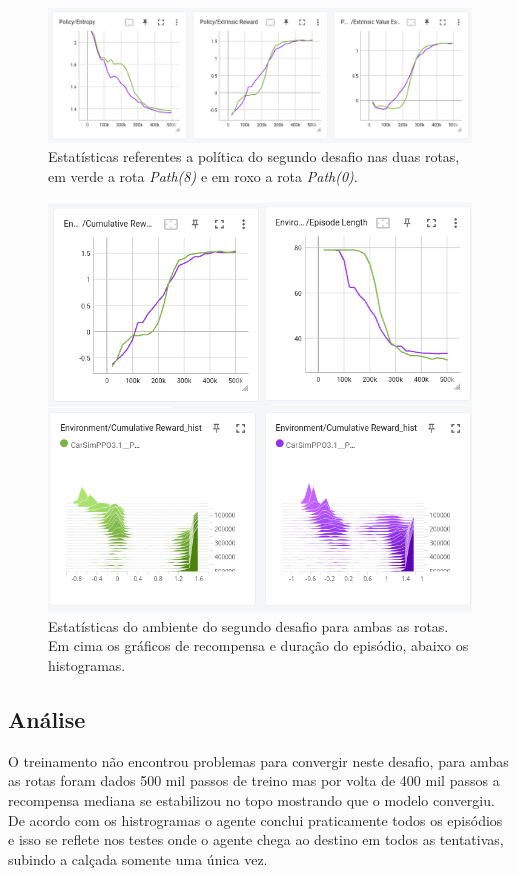 \begin{figure}[h]
    \centering
    \includegraphics[scale=0.35]{figs/treinos/desafio-mediano/politica.png}
    \caption{Estatísticas referentes a política do segundo desafio nas duas rotas, em verde a rota \textit{Path(8)} e em roxo a rota \textit{Path(0)}.}
\end{figure}

\begin{figure}[h]
    \centering
    \includegraphics[scale=1.5]{figs/treinos/desafio-mediano/ambiente-2por2.png}
    \caption{Estatísticas do ambiente do segundo desafio para ambas as rotas. Em cima os gráficos de recompensa e duração do episódio, abaixo os histogramas.}
\end{figure}


\subsection*{Análise}
O treinamento não encontrou problemas para convergir neste desafio, para ambas as rotas foram dados 500 mil passos de treino mas por volta de 400 mil passos a recompensa mediana se estabilizou no topo mostrando que o modelo convergiu. De acordo com os histrogramas o agente conclui praticamente todos os episódios e isso se reflete nos testes onde o agente chega ao destino em todos as tentativas, subindo a calçada somente uma única vez.

